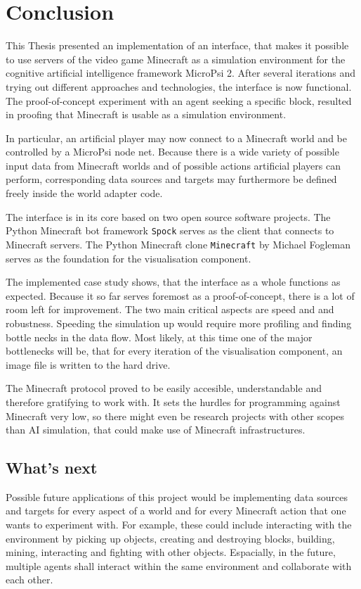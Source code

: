 \chapter{Conclusion}
This Thesis presented an implementation of an interface, that makes it possible to use servers of the video game Minecraft as a simulation environment for the cognitive artificial intelligence framework MicroPsi 2. After several iterations and trying out different approaches and technologies, the interface is now functional. The proof-of-concept experiment with an agent seeking a specific block, resulted in proofing that Minecraft is usable as a simulation environment.

In particular, an artificial player may now connect to a Minecraft world and be controlled by a MicroPsi node net. Because there is a wide variety of possible input data from Minecraft worlds and of possible actions artificial players can perform, corresponding data sources and targets may furthermore be defined freely inside the world adapter code.

The interface is in its core based on two open source software projects. The Python Minecraft bot framework \texttt{Spock} serves as the client that connects to Minecraft servers. The Python Minecraft clone \texttt{Minecraft} by Michael Fogleman serves as the foundation for the visualisation component.

The implemented case study shows, that the interface as a whole functions as expected. Because it so far serves foremost as a proof-of-concept, there is a lot of room left for improvement. The two main critical aspects are speed and and robustness. Speeding the simulation up would require more profiling and finding bottle necks in the data flow. Most likely, at this time one of the major bottlenecks will be, that for every iteration of the visualisation component, an image file is written to the hard drive.

The Minecraft protocol proved to be easily accesible, understandable and therefore gratifying to work with. It sets the hurdles for programming against Minecraft very low, so there might even be research projects with other scopes than AI simulation, that could make use of Minecraft infrastructures.

\section{What's next}
Possible future applications of this project would be implementing data sources and targets for every aspect of a world and for every Minecraft action that one wants to experiment with. For example, these could include interacting with the environment by picking up objects, creating and destroying blocks, building, mining, interacting and fighting with other objects. Espacially, in the future, multiple agents shall interact within the same environment and collaborate with each other.